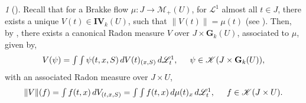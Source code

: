 \documentclass{article}
\theoremstyle{plain}
\theoremstyle{definition}
\theoremstyle{plain}
\theoremstyle{remark}
\newtheorem{propparagraph}[theorem]{}
\theoremstyle{remark}
\theoremstyle{plain}
\begin{document}
\begin{propparagraph}[]\label{proppara: space-time-Grassmann measure from Brakke flow}
    Recall that for a Brakke flow $\mu \colon J \rightarrow \mathscr{M}_{+} (U)$, for $\mathscr{L}^{1}$ almost all $t \in J$, there exists a unique $V (t) \in \mathbf{IV}_{k} (U)$, such that $\| V (t) \| = \mu (t)$ (see \cite[3.10.6]{LW-Space-Time-GrassmannMeasureBrakkeFlow}). 
    Then, by \cite[3.10.8]{LW-Space-Time-GrassmannMeasureBrakkeFlow}, there exists a canonical Radon measure $V$ over $J \times \mathbf{G}_{k} (U)$, associated to $\mu$, given by, 
    \begin{equation*}
      \textstyle  V (\psi) = \int \int \psi (t, x, S) \, d V (t)_{(x, S)} \, d \mathscr{L}^{1}_{t}, \hspace{0.5cm} \psi \in \mathscr{K} (J \times \mathbf{G}_{k} (U)),
    \end{equation*}
    with an associated Radon measure over $J \times U$, 
    \begin{equation*}
        \textstyle \| V \| (f) = \int f (t, x) \, d V_{(t, x, S)} = \int \int f (t, x) \, d \mu (t)_{x} \, d \mathscr{L}^{1}_{t}, \hspace{0.5cm} f \in \mathscr{K} (J \times U).
    \end{equation*}
\end{propparagraph}
\end{document}
